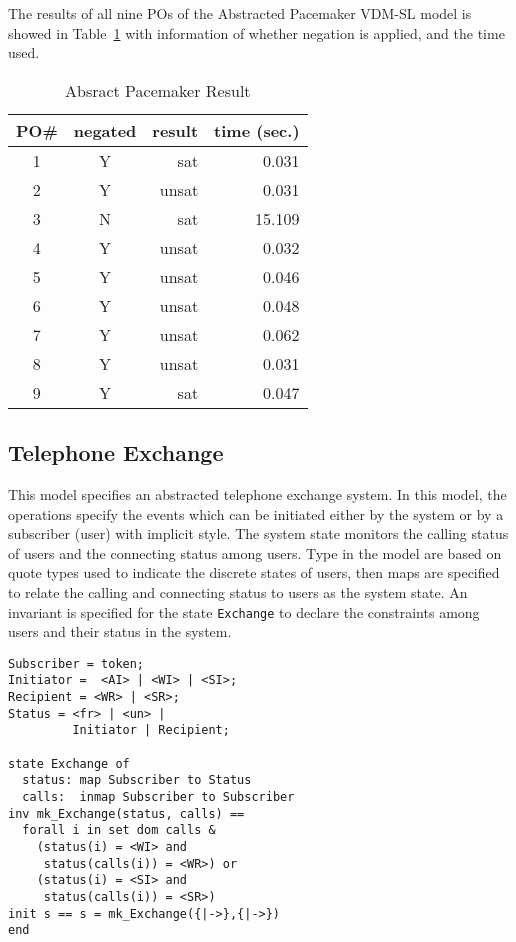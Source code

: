 The results of all nine POs of the Abstracted Pacemaker VDM-SL model is showed in Table~\ref{tbl:result1} with information of whether negation is applied, and the time used.

\begin{table}[htb]
\begin{center}
\begin{tabular}{|c|c|r|r|}
\hline
PO\#	&	negated	&	result	&	time (sec.) \\ \hline
1		&	Y		&	sat		&	0.031 \\ \hline
2		&	Y		&	unsat	&	0.031 \\ \hline
3		&	N		&	sat		&	15.109 \\ \hline
4		&	Y		&	unsat	&	0.032 \\ \hline
5		&	Y		&	unsat	&	0.046 \\ \hline
6		&	Y		&	unsat	&	0.048 \\ \hline
7		&	Y		&	unsat	&	0.062 \\ \hline
8		&	Y		&	unsat	&	0.031 \\ \hline
9		&	Y		&	sat		&	0.047 \\ \hline
\end{tabular}
\end{center}
\caption{Absract Pacemaker Result}
\label{tbl:result1}
\end{table}


\subsection{Telephone Exchange}

This model specifies an abstracted telephone exchange system. In this model, the operations specify the events which can be initiated either by the system or by a subscriber (user) with implicit style. The system state monitors the calling status of users and the connecting status among users. Type in the model are based on quote types used to indicate the discrete states of users, then maps are specified to relate the calling and connecting status to users as the system state. An invariant is specified for the state {\tt Exchange} to declare the constraints among users and their status in the system.

\begin{mdframed}[roundcorner=5pt]
\begin{Verbatim}[fontsize=\small]
Subscriber = token;
Initiator =  <AI> | <WI> | <SI>;
Recipient = <WR> | <SR>;
Status = <fr> | <un> |
         Initiator | Recipient;
                                                                      
state Exchange of
  status: map Subscriber to Status
  calls:  inmap Subscriber to Subscriber
inv mk_Exchange(status, calls) == 
  forall i in set dom calls & 
    (status(i) = <WI> and
     status(calls(i)) = <WR>) or
    (status(i) = <SI> and
     status(calls(i)) = <SR>)
init s == s = mk_Exchange({|->},{|->})
end
\end{Verbatim}
\end{mdframed}

